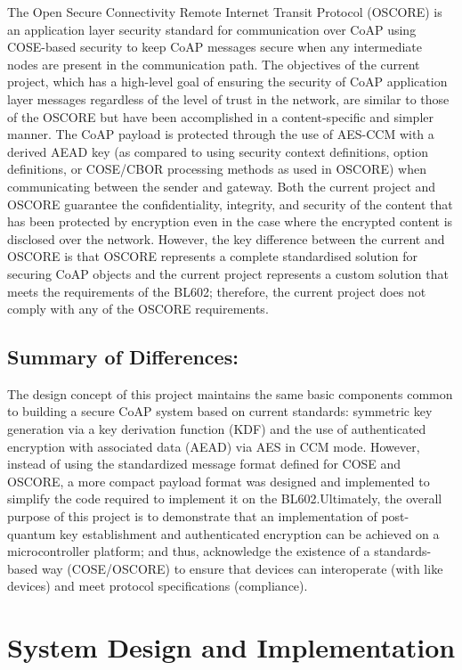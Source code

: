 \documentclass[a4paper]{scrartcl}
\begin{document}
    The Open Secure Connectivity Remote Internet Transit Protocol (OSCORE) is an application layer security standard for communication over CoAP using COSE-based security to keep CoAP messages secure when any intermediate nodes are present in the communication path. The objectives of the current project, which has a high-level goal of ensuring the security of CoAP application layer messages regardless of the level of trust in the network, are similar to those of the OSCORE but have been accomplished in a content-specific and simpler manner. The CoAP payload is protected through the use of AES-CCM with a derived AEAD key (as compared to using security context definitions, option definitions, or COSE/CBOR processing methods as used in OSCORE) when communicating between the sender and gateway. Both the current project and OSCORE guarantee the confidentiality, integrity, and security of the content that has been protected by encryption even in the case where the encrypted content is disclosed over the network. However, the key difference between the current and OSCORE is that OSCORE represents a complete standardised solution for securing CoAP objects and the current project represents a custom solution that meets the requirements of the BL602; therefore, the current project does not comply with any of the OSCORE requirements.
    
    \subsection{Summary of Differences:}
    
    The design concept of this project maintains the same basic components common to building a secure CoAP system based on current standards: symmetric key generation via a key derivation function (KDF) and the use of authenticated encryption with associated data (AEAD) via AES in CCM mode. However, instead of using the standardized message format defined for COSE and OSCORE, a more compact payload format was designed and implemented to simplify the code required to implement it on the BL602.Ultimately, the overall purpose of this project is to demonstrate that an implementation of post-quantum key establishment and authenticated encryption can be achieved on a microcontroller platform; and thus, acknowledge the existence of a standards-based way (COSE/OSCORE) to ensure that devices can interoperate (with like devices) and meet protocol specifications (compliance).
    \section{System Design and Implementation}
	
\end{document}
